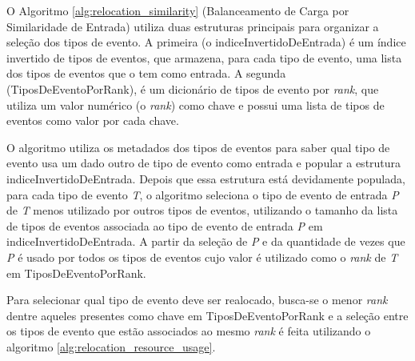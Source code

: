 O Algoritmo \ref{alg:relocation_similarity} (Balanceamento de Carga por Similaridade de Entrada) utiliza duas estruturas principais para organizar a seleção dos tipos de evento. A primeira (o indiceInvertidoDeEntrada) é um índice invertido de tipos de eventos, que armazena, para cada tipo de evento, uma lista dos tipos de eventos que o tem como entrada. A segunda (TiposDeEventoPorRank), é um dicionário de tipos de evento por \textit{rank}, que utiliza um valor numérico (o \textit{rank}) como chave e possui uma lista de tipos de eventos como valor por cada chave. 

O algoritmo utiliza os metadados dos tipos de eventos para saber qual tipo de evento usa um dado outro de tipo de evento como entrada e popular a estrutura indiceInvertidoDeEntrada. Depois que essa estrutura está devidamente populada, para cada tipo de evento \textit{T}, o algoritmo seleciona o tipo de evento de entrada \textit{P} de \textit{T} menos utilizado por outros tipos de eventos, utilizando o tamanho da lista de tipos de eventos associada ao tipo de evento de entrada \textit{P} em indiceInvertidoDeEntrada. A partir da seleção de \textit{P} e da quantidade de vezes que \textit{P} é usado por todos os tipos de eventos cujo valor é utilizado como o \textit{rank} de \textit{T} em TiposDeEventoPorRank.%

Para selecionar qual tipo de evento deve ser realocado, busca-se o menor \textit{rank} dentre aqueles presentes como chave em TiposDeEventoPorRank e a seleção entre os tipos de evento que estão associados ao mesmo \textit{rank} é feita utilizando o algoritmo \ref{alg:relocation_resource_usage}.



